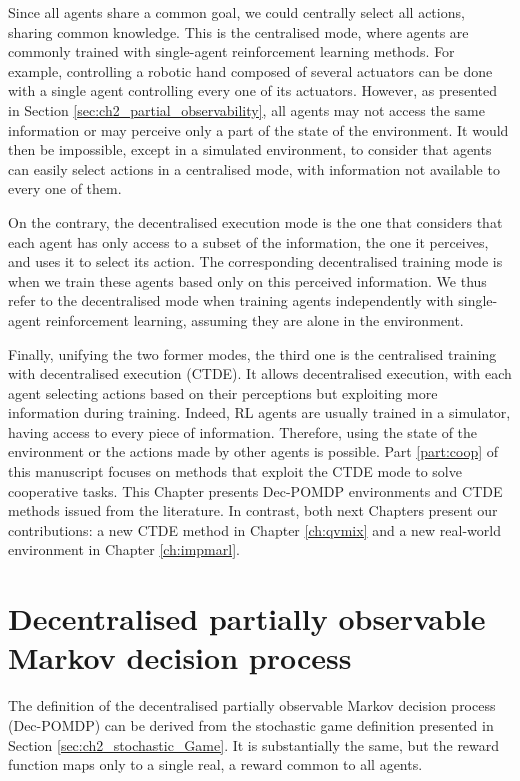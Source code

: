 Since all agents share a common goal, we could centrally select all actions, sharing common knowledge.
This is the centralised mode, where agents are commonly trained with single-agent reinforcement learning methods.
For example, controlling a robotic hand composed of several actuators can be done with a single agent controlling every one of its actuators.
However, as presented in Section \ref{sec:ch2_partial_observability}, all agents may not access the same information or may perceive only a part of the state of the environment.
It would then be impossible, except in a simulated environment, to consider that agents can easily select actions in a centralised mode, with information not available to every one of them.

On the contrary, the decentralised execution mode is the one that considers that each agent has only access to a subset of the information, the one it perceives, and uses it to select its action.
The corresponding decentralised training mode is when we train these agents based only on this perceived information.
We thus refer to the decentralised mode when training agents independently with single-agent reinforcement learning, assuming they are alone in the environment.

Finally, unifying the two former modes, the third one is the centralised training with decentralised execution (CTDE).
It allows decentralised execution, with each agent selecting actions based on their perceptions but exploiting more information during training.
Indeed, RL agents are usually trained in a simulator, having access to every piece of information.
Therefore, using the state of the environment or the actions made by other agents is possible.
Part \ref{part:coop} of this manuscript focuses on methods that exploit the CTDE mode to solve cooperative tasks.
This Chapter presents Dec-POMDP environments and CTDE methods issued from the literature. 
In contrast, both next Chapters present our contributions: a new CTDE method in Chapter \ref{ch:qvmix} and a new real-world environment in Chapter \ref{ch:impmarl}.

\section{Decentralised partially observable Markov decision process}
\label{sec:ch3_decpomdp}
The definition of the decentralised partially observable Markov decision process (Dec-POMDP) \citep{DecPomdp} can be derived from the stochastic game definition presented in Section \ref{sec:ch2_stochastic_Game}.
It is substantially the same, but the reward function maps only to a single real, a reward common to all agents.

